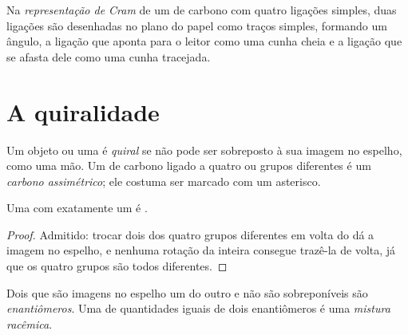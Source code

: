 \begin{definition}\label{def:g12:stereochemistry:cram}
Na \emph{representação de Cram} de um 
de carbono com quatro ligações simples, duas ligações são desenhadas no
plano do papel como traços simples, formando um ângulo, a ligação que
aponta para o leitor como uma cunha cheia e a ligação que se afasta dele
como uma cunha tracejada.
\end{definition}

\section{A quiralidade}

\begin{definition}\label{def:g12:stereochemistry:chiral}
Um objeto ou uma  é \emph{quiral} se não pode ser
sobreposto à sua imagem no espelho, como uma mão. Um  de carbono
ligado a quatro  ou grupos diferentes é um \emph{carbono
assimétrico}; ele costuma ser marcado com um
asterisco.
\end{definition}

\begin{proposition}\label{prop:g12:stereochemistry:one-carbon}
Uma  com exatamente um  é .
\end{proposition}

\begin{proof}
Admitido: trocar dois dos quatro grupos diferentes em volta do  dá a imagem no espelho, e nenhuma rotação da 
inteira consegue trazê-la de volta, já que os quatro grupos são todos
diferentes.
\end{proof}

\begin{definition}\label{def:g12:stereochemistry:enantiomer}
Dois  que são imagens no espelho um do outro e não são
sobreponíveis são \emph{enantiômeros}. Uma  de
quantidades iguais de dois enantiômeros é uma \emph{mistura
racêmica}.
\end{definition}


